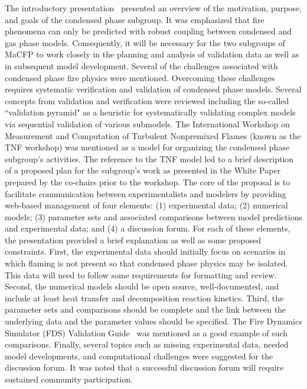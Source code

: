 The introductory presentation~\cite{CPS:Bruns} presented an overview of the motivation, purpose, and goals of the condensed phase subgroup.  It was emphasized that fire phenomena can only be predicted with robust coupling between condensed and gas phase models.  Consequently, it will be necessary for the two subgroups of MaCFP to work closely in the planning and analysis of validation data as well as in subsequent model development.  Several of the challenges associated with condensed phase fire physics were mentioned.  Overcoming these challenges requires systematic verification and validation of condensed phase models.  Several concepts from validation and verification were reviewed including the so-called ``validation pyramid" as a heuristic for systematically validating complex models via sequential validation of various submodels.  The International Workshop on Measurement and Computation of Turbulent Nonpremixed Flames (known as the TNF workshop) was mentioned as a model for organizing the condensed phase subgroup's activities.  The reference to the TNF model led to a brief description of a proposed plan for the subgroup's work as presented in the White Paper~\cite{MaCFP_website} prepared by the co-chairs prior to the workshop.  The core of the proposal is to facilitate communication between experimentalists and modelers by providing web-based management of four elements:  (1) experimental data; (2) numerical models; (3) parameter sets and associated comparisons between model predictions and experimental data; and (4) a discussion forum.  For each of these elements, the presentation provided a brief explanation as well as some proposed constraints.  First, the experimental data should initially focus on scenarios in which flaming is not present so that condensed phase physics may be isolated.  This data will need to follow some requirements for formatting and review.  Second, the numerical models should be open source, well-documented, and include at least heat transfer and decomposition reaction kinetics.  Third, the parameter sets and comparisons should be complete and the link between the underlying data and the parameter values should be specified.  The Fire Dynamics Simulator (FDS) Validation Guide~\cite{FDS_Validation_Guide} was mentioned as a good example of such comparisons.  Finally, several topics such as missing experimental data, needed model developments, and computational challenges were suggested for the discussion forum.  It was noted that a successful discussion forum will require sustained community participation.


